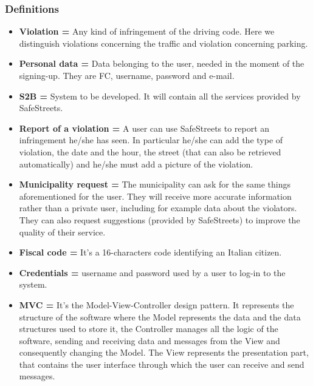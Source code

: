 \documentclass[titlepage]{article}
\begin{document}
\subsubsection{Definitions}
\begin{itemize}
	\item \textbf{Violation =} Any kind of infringement of the driving code. Here we distinguish violations concerning the traffic and violation concerning parking.\\
	\item \textbf{Personal data =} Data belonging to the user, needed in the moment of the signing-up. They are FC, username, password and e-mail.
	\item \textbf{S2B =} System to be developed. It will contain all the services provided by SafeStreets.
	\item \textbf{Report of a violation =} A user can use SafeStreets to report an infringement he/she has seen. In particular he/she can add the type of violation, the date and the hour, the street (that can also be retrieved automatically) and he/she must add a picture of the violation.
	\item \textbf{Municipality request =} The municipality can ask for the same things aforementioned for the user. They will receive more accurate information rather than a private user, including for example data about the violators. They can also request suggestions (provided by SafeStreets) to improve the quality of their service.
	\item \textbf{Fiscal code =} It's a 16-characters code identifying an Italian citizen.
	\item \textbf{Credentials =} username and password used by a user to log-in to the system.
	\item \textbf{MVC =} It's the Model-View-Controller design pattern. It represents the structure of the software where the Model represents the data and the data structures used to store it, the Controller manages all the logic of the software, sending and receiving data and messages from the View and consequently changing the Model. The View represents the presentation part, that contains the user interface through which the user can receive and send messages.
	
\end{itemize}
\end{document}
